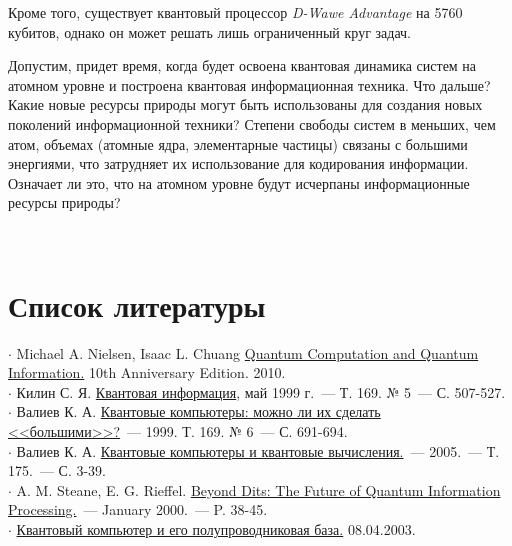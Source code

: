 \begin{multicols}{2}
{        Кроме того, существует квантовый процессор \emph{D-Wawe Advantage} на 5760 кубитов, однако он может решать лишь ограниченный круг задач.

        Допустим, придет время, когда будет освоена квантовая динамика систем на атомном уровне и построена квантовая информационная техника. Что дальше? Какие новые ресурсы природы могут быть использованы
        для создания новых поколений информационной техники? Степени свободы систем в меньших, чем атом, объемах (атомные ядра, элементарные частицы) связаны с большими энергиями, что затрудняет их использование для кодирования информации.
        Означает ли это, что на атомном уровне будут исчерпаны информационные ресурсы природы?
    }\\
    \section*{Список литературы}
    \small{
    $\cdot$ Michael A. Nielsen, Isaac L. Chuang \href{http://mmrc.amss.cas.cn/tlb/201702/W020170224608149940643.pdf}{Quantum Computation and Quantum Information.} 10th Anniversary Edition. 2010.\\
    $\cdot$ Килин С. Я. \href{https://web.archive.org/web/20100929192824/http://ufn.ru/ru/articles/1999/5/b/}{Квантовая информация}, май 1999 г.~--- Т. 169. № 5~--- С. 507-527.\\
    $\cdot$ Валиев К. А. \href{https://ufn.ru/ru/articles/1999/6/i/}{Квантовые компьютеры: можно ли их сделать <<большими>>?}~--- 1999. Т. 169. № 6~--- С. 691-694.\\
    $\cdot$ Валиев К. А. \href{https://ufn.ru/ru/articles/2005/1/a/}{Квантовые компьютеры и квантовые вычисления.}~--- 2005.~--- Т. 175.~--- С. 3-39.\\
    $\cdot$ A. M. Steane, E. G. Rieffel. \href{https://web.archive.org/web/20061017015251/http://www.fxpal.com/?p=abstract&abstractID=50}{Beyond Dits: The Future of Quantum Information Processing.}~--- January 2000.~--- P. 38-45.\\
    $\cdot$ \href{http://psj.nsu.ru/lector/neizvestniy/}{Квантовый компьютер и его полупроводниковая база.} 08.04.2003.
    }
\end{multicols}